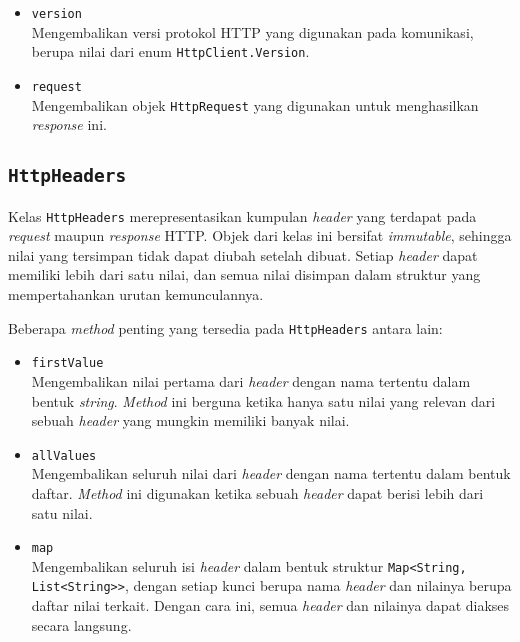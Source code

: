 \begin{itemize}
    \item \texttt{version}\\
    Mengembalikan versi protokol HTTP yang digunakan pada komunikasi, berupa nilai dari enum \texttt{HttpClient.Version}.
    
    \item \texttt{request}\\
    Mengembalikan objek \texttt{HttpRequest} yang digunakan untuk menghasilkan \textit{response} ini.
\end{itemize}



\subsection{\texttt{HttpHeaders}}
\label{subsec:0228-httpheaders}

Kelas \texttt{HttpHeaders} merepresentasikan kumpulan \textit{header} yang terdapat pada \textit{request} maupun \textit{response} HTTP. Objek dari kelas ini bersifat \textit{immutable}, sehingga nilai yang tersimpan tidak dapat diubah setelah dibuat. Setiap \textit{header} dapat memiliki lebih dari satu nilai, dan semua nilai disimpan dalam struktur yang mempertahankan urutan kemunculannya.

Beberapa \textit{method} penting yang tersedia pada \texttt{HttpHeaders} antara lain:

\begin{itemize}
    \item \texttt{firstValue}\\
    Mengembalikan nilai pertama dari \textit{header} dengan nama tertentu dalam bentuk \textit{string}. \textit{Method} ini berguna ketika hanya satu nilai yang relevan dari sebuah \textit{header} yang mungkin memiliki banyak nilai.
    
    \item \texttt{allValues}\\
    Mengembalikan seluruh nilai dari \textit{header} dengan nama tertentu dalam bentuk daftar. \textit{Method} ini digunakan ketika sebuah \textit{header} dapat berisi lebih dari satu nilai.
    
    \item \texttt{map}\\
    Mengembalikan seluruh isi \textit{header} dalam bentuk struktur \texttt{Map<String, List<String>>}, dengan setiap kunci berupa nama \textit{header} dan nilainya berupa daftar nilai terkait. Dengan cara ini, semua \textit{header} dan nilainya dapat diakses secara langsung.
\end{itemize}


